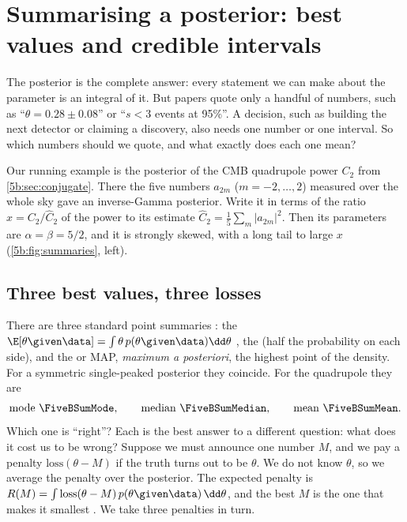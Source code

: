 \section{Summarising a posterior: best values and credible intervals}
\label{5b:sec:summaries}

The posterior is the complete answer: every statement we can make about the parameter
is an integral of it. But papers quote only a handful of numbers, such as
``$\theta=0.28\pm0.08$'' or ``$s<3$ events at 95\%''. A decision, such as building the
next detector or claiming a discovery, also needs one number or one interval. So which
numbers should we quote, and what exactly does each one mean?

Our running example is the posterior of the CMB quadrupole power $C_2$ from
\cref{5b:sec:conjugate}. There the five numbers $a_{2m}$ ($m=-2,\dots,2$) measured over
the whole sky gave an inverse-Gamma posterior. Write it in terms of the ratio
$x=C_2/\widehat C_2$ of the power to its estimate $\widehat C_2=\frac15\sum_m|a_{2m}|^2$.
Then its parameters are $\alpha=\beta=5/2$, and it is strongly skewed, with a long tail
to large $x$ (\cref{5b:fig:summaries}, left).

\subsection{Three best values, three losses}

There are three standard point summaries : the
 $\E[\theta\given\data]=\int\theta\,p(\theta\given\data)
\dd\theta$ , the  (half the
probability on each side), and the  or MAP, \emph{maximum a
posteriori}, the highest point of the density. For a symmetric single-peaked posterior
they coincide. For the quadrupole they are
\[
  \text{mode }\FiveBSumMode,\qquad\text{median }\FiveBSumMedian,\qquad
  \text{mean }\FiveBSumMean .
\]
Which one is ``right''? Each is the best answer to a different question: what does it
cost us to be wrong? Suppose we must announce one number $M$, and we pay a penalty
$\mathrm{loss}(\theta-M)$ if the truth turns out to be $\theta$. We do not know
$\theta$, so we average the penalty over the posterior. The expected penalty is
$R(M)=\int\mathrm{loss}(\theta-M)\,p(\theta\given\data)\,\dd\theta$, and the best $M$ is
the one that makes it smallest . We take three penalties in
turn.


